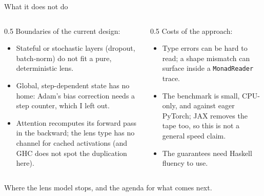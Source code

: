 \documentclass[aspectratio=169,11pt]{beamer}
\begin{document}
\begin{frame}{What it does not do}
  \begin{columns}[T]
    \begin{column}{0.5\textwidth}
      \footnotesize Boundaries of the current design:
      \begin{itemize}\footnotesize\setlength\itemsep{0.25em}
        \item Stateful or stochastic layers (dropout, batch-norm) do not fit a pure, deterministic lens.
        \item Global, step-dependent state has no home: Adam's bias correction needs a step counter,
              which I left out.
        \item Attention recomputes its forward pass in the backward; the lens type has no channel for
              cached activations (and GHC does not spot the duplication here).
      \end{itemize}
    \end{column}
    \begin{column}{0.5\textwidth}
      \footnotesize Costs of the approach:
      \begin{itemize}\footnotesize\setlength\itemsep{0.25em}
        \item Type errors can be hard to read; a shape mismatch can surface inside a
              \texttt{MonadReader} trace.
        \item The benchmark is small, CPU-only, and against eager PyTorch; JAX removes the tape too,
              so this is not a general speed claim.
        \item The guarantees need Haskell fluency to use.
      \end{itemize}
    \end{column}
  \end{columns}
  \vspace{0.4em}
  \centering\footnotesize Where the lens model stops, and the agenda for what comes next.
\end{frame}
\end{document}
